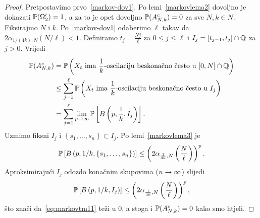 \documentclass[main.tex]{subfiles}
\begin{document}
\begin{proof}
	Pretpostavimo prvo~\eqref{markov-dov1}. Po lemi~\ref{markovlema2} dovoljno je dokazati
	\( \P(\Omega_2') = 1 \), a za to je opet dovoljno \( \P(A_{N,k}^c) = 0 \) za sve \( N, k \in N \).
	Fiksirajmo \( N \) i \( k \). Po~\eqref{markov-dov1} odaberimo \( \ell \)
	takav da \( 2\alpha_{1/(4k), N}(N/\ell) < 1 \). Definiramo \( t_j = \frac{Nj}\ell \) za \( 0 \le j \le \ell \) i \( I_j = \left[ t_{j-1}, t_j \right] \cap \Q \) za \( j > 0 \). Vrijedi
	\begin{align}
		\P(A_{N,k}^c) & = \P\left( X_t \text{\ ima\ } \frac 1k \text{-oscilaciju beskonačno često u\ } [0,N]\cap \Q \right)            \\
		              & \le \sum_{j=1}^\ell \P\left( X_t \text{\ ima\ } \frac 1k \text{-oscilaciju beskonačno često u\  } I_j \right)  \\
		              & =\sum_{j=1}^\ell \lim\limits_{p \ub} \P \left[ B\left( p, \frac 1k, I_j \right) \right]. \label{eq:markovtm11}
	\end{align}
	Uzmimo fiksni \( I_j \) i \( \left\{ s_1, \ldots, s_n \right\} \subset I_j \). Po lemi~\ref{markovlema3} je
	\begin{equation}
		\P\left[ B\left(p, 1/k, \left\{ s_1, \ldots, s_n  \right\}\right) \right] \le
		\left( 2\alpha_{\frac 1{4k}, N} \left( \frac N\ell \right)  \right)^p.
	\end{equation}
	Aproksimirajući \( I_j \) odozdo konačnim skupovima (\( n \ub \)) slijedi
	\begin{equation}
		\P\left[ B\left(p, 1/k, I_j\right) \right] \le
		\left( 2\alpha_{\frac 1{4k}, N} \left( \frac N\ell \right)  \right)^p,
	\end{equation}
	što znači da~\eqref{eq:markovtm11} teži u \( 0 \), a stoga i \( \P(A_{N,k}^c)=0 \) kako smo htjeli.


\end{proof}
\end{document}

